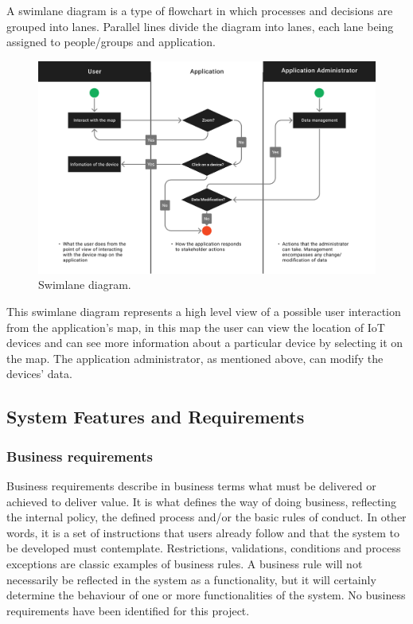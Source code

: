 A swimlane diagram is a type of flowchart in which processes and decisions
are grouped into lanes. Parallel lines divide the diagram into lanes, each
lane being assigned to people/groups and application.
\begin{figure}[H]
    \centering
    \includegraphics[width=15cm]{../app/docs/software_requirements/assets/images/swimlane_diagram.png}
    \caption{Swimlane diagram.}
    \label{fig:diagram swimlane}
\end{figure}
This swimlane diagram represents a high level view of a possible user interaction
from the application's map, in this map the user can view the location of
IoT devices and can see more information about a particular device by selecting
it on the map. The application administrator, as mentioned above, can modify the
devices' data.

\subsection*{System Features and Requirements}

\subsubsection*{Business requirements}

Business requirements describe in business terms what must be delivered
or achieved to deliver value. It is what defines the way of doing business,
reflecting the internal policy, the defined process and/or the basic rules
of conduct.  In other words, it is a set of instructions that users already
follow and that the system to be developed must contemplate. Restrictions,
validations, conditions and process exceptions are classic examples of business
rules. A business rule will not necessarily be reflected in the system as
a functionality, but it will certainly determine the behaviour of one or
more functionalities of the system.
\newline
No business requirements have been identified for this project.

